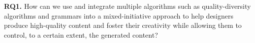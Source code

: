    
   
   
   
        
    

\begin{retQuestion}{}
   
   \textbf{RQ1.} How can we use and integrate multiple algorithms such as quality-diversity algorithms and grammars into a mixed-initiative approach to help designers produce high-quality content and foster their creativity while allowing them to control, to a certain extent, the generated content?
\end{retQuestion}


